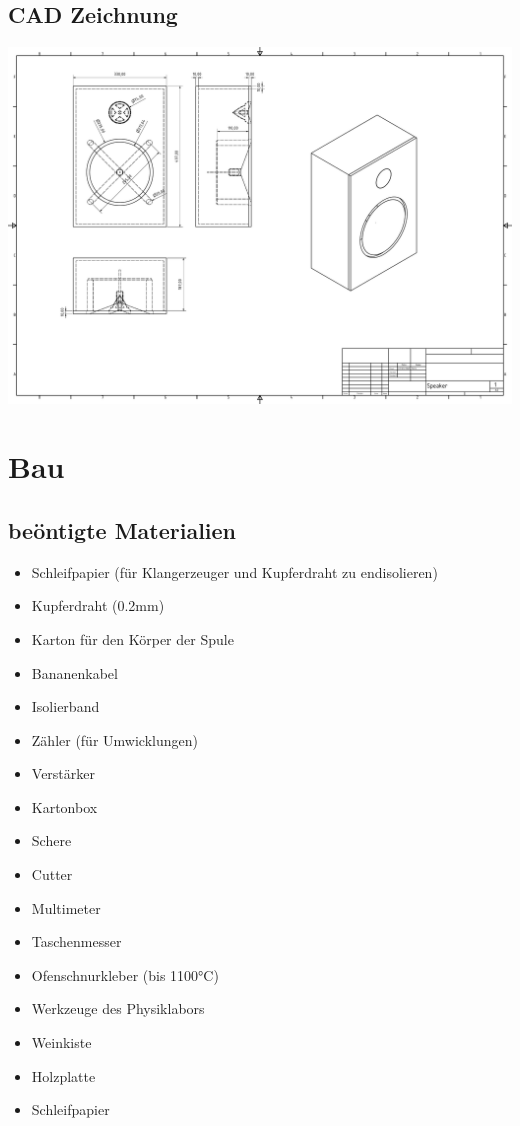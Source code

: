 \documentclass[a4paper,11pt]{report}
\begin{document}
\section{CAD Zeichnung}
\includegraphics[width=1\textwidth]{resources/pdf/Speaker.pdf}
\chapter{Bau}
\section{beöntigte Materialien}
\begin{multicols}{2}
    \begin{itemize}[parsep=0pt]
        \item Schleifpapier (für Klangerzeuger und Kupferdraht zu endisolieren)
        \item Kupferdraht (0.2mm)
        \item Karton für den Körper der Spule
        \item Bananenkabel
        \item Isolierband
        \item Zähler (für Umwicklungen)
        \item Verstärker
        \item Kartonbox
        \item Schere
        \item Cutter
        \item Multimeter
        \item Taschenmesser
        \item Ofenschnurkleber (bis 1100°C)
        \item Werkzeuge des Physiklabors
        \item Weinkiste
        \item Holzplatte
        \item Schleifpapier
    \end{itemize}
\end{multicols}
\end{document}
